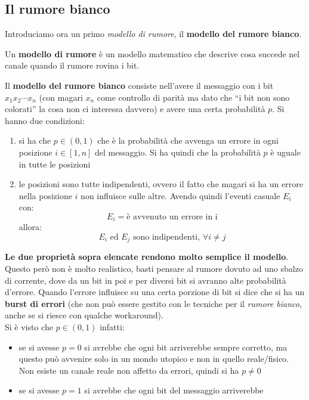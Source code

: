 \documentclass[a4paper,12pt, oneside]{book}
\begin{document}
\subsection{Il rumore bianco}
Introduciamo ora un primo \textit{modello di rumore}, il \textbf{modello del
  rumore bianco}.
\begin{definizione}
  Un \textbf{modello di rumore} è un modello matematico che descrive cosa
  succede nel canale quando il rumore rovina i bit.
\end{definizione}
\begin{definizione}
  Il \textbf{modello del rumore bianco} consiste nell'avere il messaggio con i
  bit $x_1x_2\cdots x_n$ (con magari $x_n$ come controllo di parità ma dato che
  ``i bit non sono colorati'' la cosa non ci interessa davvero) e avere una
  certa probabilità $p$. Si hanno due condizioni:
  \begin{enumerate}
    \item si ha che $p\in(0,1)$ che è la probabilità che avvenga
    un errore in ogni posizione $i\in [1,n]$ del messaggio. Si ha quindi che la
    probabilità $p$ è uguale in tutte le posizioni
    \item le posizioni sono tutte indipendenti, ovvero il fatto che magari si ha
    un errore nella posizione $i$ non influisce sulle altre. Avendo quindi
    l'eventi casuale $E_i$ con:
    \[E_i=\mbox{è avvenuto un errore in i}\]
    allora:
    \[E_i\mbox{ ed }E_j \mbox{ sono indipendenti, }\forall i\neq j\]
  \end{enumerate}
  \textbf{Le due proprietà sopra elencate rendono molto semplice il modello}.\\
  Questo però non è molto realistico, basti pensare al rumore dovuto ad uno
  sbalzo di corrente, dove da un bit in poi e per diversi bit si avranno alte
  probabilità d'errore. Quando l'errore influisce su una certa porzione di bit
  si dice che si ha un \textbf{burst di errori} (che non può essere gestito con
  le tecniche per il \textit{rumore bianco}, anche se si riesce con qualche
  workaround).\\
  Si è visto che $p\in(0,1)$ infatti:
  \begin{itemize}
    \item se si avesse $p=0$ si avrebbe che ogni bit arriverebbe sempre
    corretto, ma questo può avvenire solo in un mondo utopico e non in quello
    reale/fisico. Non esiste un canale reale non affetto da errori, quindi si ha
    $p\neq 0$
    \item se si avesse $p=1$ si avrebbe che ogni bit del messaggio arriverebbe

\end{itemize}
\end{definizione}
\end{document}
